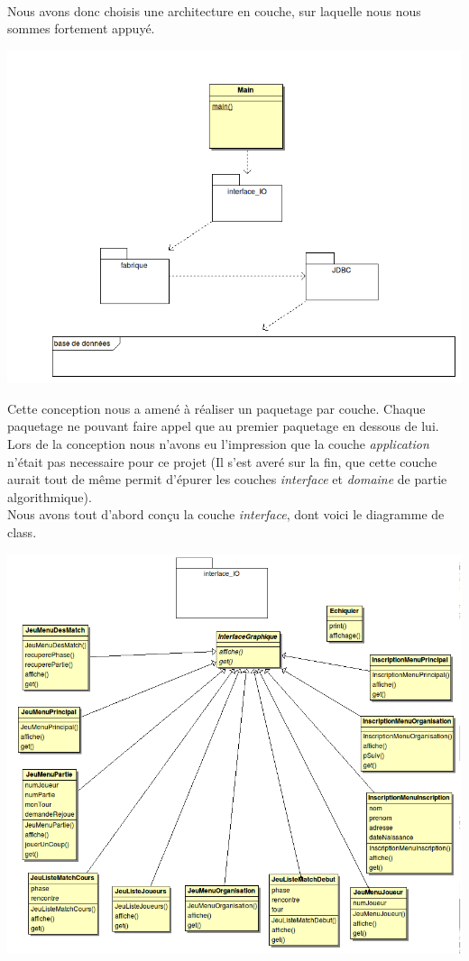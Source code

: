 \documentclass[10pt,a4paper]{report}
\begin{document}
\paragraph{}Nous avons donc choisis une architecture en couche, sur laquelle nous nous sommes fortement appuyé.
\begin{center}
\includegraphics[width=14cm]{DiagClasseJavaPackage.png}
\end{center}
\mbox{}\hspace{0.4cm}Cette conception nous a amené à réaliser un paquetage par couche. Chaque paquetage ne pouvant faire appel que au premier paquetage en dessous de lui.\\
Lors de la conception nous n'avons eu l'impression que la couche \textit{application} n'était pas necessaire pour ce projet (Il s'est averé sur la fin, que cette couche aurait tout de même permit d'épurer les couches \textit{interface} et \textit{domaine} de partie algorithmique).\\
\mbox{}\hspace{0.4cm}Nous avons tout d'abord conçu la couche \textit{interface}, dont voici le diagramme de class.\\
\begin{center}
\includegraphics[width=18cm]{DiagClasseJavaInterface.png}
\end{center}
\end{document}
